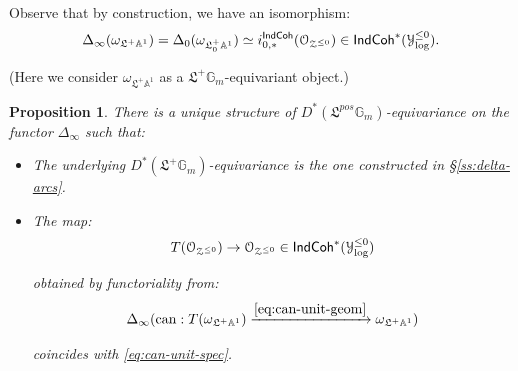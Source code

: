 \documentclass[reqno,11pt]{amsart}
\numberwithin{equation}{subsection}
\newtheorem{prop}[thm]{Proposition}
\theoremstyle{remark}
\newcommand{\xar}[1]{\xrightarrow{#1}}
\newcommand{\bA}{{\mathbb A}}
\newcommand{\bG}{{\mathbb G}}
\newcommand{\sO}{{\EuScript O}}
\newcommand{\sY}{{\EuScript Y}}
\newcommand{\sZ}{{\EuScript Z}}
\newcommand{\fL}{{\mathfrak L}}
\newcommand{\on}{\operatorname}
\newcommand{\IndCoh}{\mathsf{IndCoh}}
\begin{document}
Observe that by construction, we have
an isomorphism:
%
\[
\Delta_{\infty}(\omega_{\fL^+\bA^1}) = \Delta_0(\omega_{\fL_0^+\bA^1}) \simeq
i_{0,*}^{\IndCoh}(\sO_{\sZ^{\leq 0}}) \in \IndCoh^*(\sY_{\log}^{\leq 0}).
\]

\noindent (Here we consider $\omega_{\fL^+\bA^1}$ as a $\fL^+\bG_m$-equivariant
object.)

\begin{prop}

There is a unique structure of 
$D^*(\fL^{pos}\bG_m)$-equivariance on the functor $\Delta_{\infty}$
such that:

\begin{itemize}

\item The underlying $D^*(\fL^+\bG_m)$-equivariance is the one
constructed in \S \ref{ss:delta-arcs}.

\item The map:
%
\[
T(\sO_{\sZ^{\leq 0}}) \to \sO_{\sZ^{\leq 0}} \in \IndCoh^*(\sY_{\log}^{\leq 0})
\]

\noindent obtained by functoriality from:
%
\[
\Delta_{\infty}(\on{can}:T(\omega_{\fL^+\bA^1}) \xar{\eqref{eq:can-unit-geom}}  
\omega_{\fL^+\bA^1})
\]

\noindent coincides with \eqref{eq:can-unit-spec}.

\end{itemize}

\end{prop}
\end{document}
